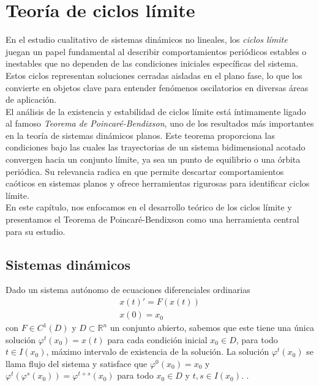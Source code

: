 \chapter{Teoría de ciclos límite}

En el estudio cualitativo de sistemas dinámicos no lineales, los \textit{ciclos límite} juegan un papel fundamental al describir comportamientos periódicos estables o inestables que no dependen de las condiciones iniciales específicas del sistema. Estos ciclos representan soluciones cerradas aisladas en el plano fase, lo que los convierte en objetos clave para entender fenómenos oscilatorios en diversas áreas de aplicación.\\

El análisis de la existencia y estabilidad de ciclos límite está íntimamente ligado al famoso \textit{Teorema de Poincaré-Bendixson}, uno de los resultados más importantes en la teoría de sistemas dinámicos planos. Este teorema proporciona las condiciones bajo las cuales las trayectorias de un sistema bidimensional acotado convergen hacia un conjunto límite, ya sea un punto de equilibrio o una órbita periódica. Su relevancia radica en que permite descartar comportamientos caóticos en sistemas planos y ofrece herramientas rigurosas para identificar ciclos límite.\\

En este capítulo, nos enfocamos en el desarrollo teórico de los ciclos límite y presentamos el Teorema de Poincaré-Bendixson como una herramienta central para su estudio.

\section{Sistemas dinámicos}

Dado un sistema autónomo de ecuaciones diferenciales ordinarias
\begin{equation}\label{eq: sistAuto}
	\begin{matrix}
		x(t)'= F(x(t))\\
		x(0)=x_0
	\end{matrix}
\end{equation}
con $F\in C^1(D)$ y $D\subset\mathbb{R}^n$ un conjunto abierto, sabemos que este tiene una única solución $\varphi^t(x_0)=x(t)$ para cada condición inicial $x_0\in D$, para todo $t\in I(x_0)$, máximo intervalo de existencia de la solución. La solución $\varphi^t(x_0)$ se llama flujo del sistema y satisface que $\varphi^0(x_0)=x_0$ y $\varphi^t(\varphi^s(x_0))=\varphi^{t+s}(x_0)$ para todo $x_0\in D$ y $t,s\in I(x_0)$. \cite{perko2001differential}. \\

